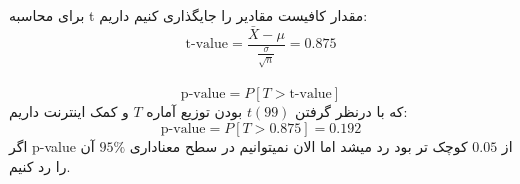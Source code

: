 \problem{}
\subproblem{}
برای محاسبه t مقدار کافیست مقادیر را جایگذاری کنیم داریم:\\
\[ \text{t-value} = \frac{\bar{X}-\mu}{\frac{\sigma}{\sqrt{n}}} = 0.875\]\\
\subproblem{}
\[ \text{p-value} = P[T>\text{t-value}]\]
که با درنظر گرفتن $t(99)$ بودن توزیع آماره $T$
و کمک اینترنت داریم:\\
\[ \text{p-value} = P[T>0.875]= 0.192\]
\subproblem{}
اگر p-value از $0.05$ کوچک تر بود رد میشد اما الان نمیتوانیم در سطح معناداری $95\%$
آن را رد کنیم.